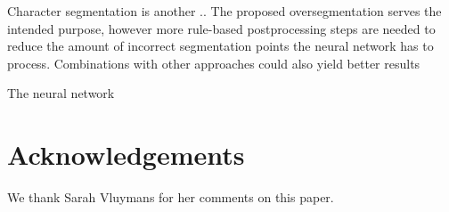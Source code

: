 \documentclass{article}
\begin{document}
Character segmentation is another ..
The proposed oversegmentation serves the intended purpose, however more rule-based postprocessing steps are needed to reduce the amount of incorrect segmentation points the neural network has to process. Combinations with other approaches could also yield better results


The neural network 
\section*{Acknowledgements}
We thank Sarah Vluymans for her comments on this paper.


\end{document}
